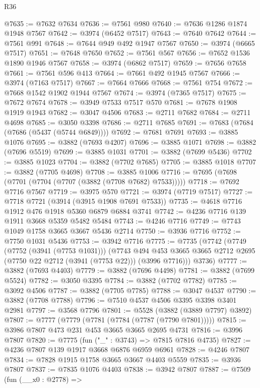 \begin{lexlean}{R36}
\begin{coremodule}
@7635 := @7632 @7634
@7636 := @7561 @980
@7640 := @7636 @1286 @1874 @1948 @7567
@7642 := @3974 (@6452 @7517)
@7643 := @7640 @7642
@7644 := @7561 @991
@7648 := @7644 @949 @492 @1947 @7567
@7650 := @3974 (@6665 @7517)
@7651 := @7648 @7650
@7652 := @7561 @567
@7656 := @7652 @1536 @1890 @1946 @7567
@7658 := @3974 (@6862 @7517)
@7659 := @7656 @7658
@7661 := @7561 @596 @413
@7664 := @7661 @492 @1945 @7567
@7666 := @3974 (@7163 @7517)
@7667 := @7664 @7666
@7668 := @7561 @754
@7672 := @7668 @1542 @1902 @1944 @7567
@7674 := @3974 (@7365 @7517)
@7675 := @7672 @7674
@7678 := @3949 @7533 @7517 @570
@7681 := @7678 @1908 @1919 @1943
@7682 := @3047 @4506
@7683 := @2711 @7682
@7684 := @2711 @4698
@7685 := @3050 @3398
@7686 := @2711 @7685
@7691 := @7683 (@7684 (@7686 (@5437 (@5744 @6849))))
@7692 := @7681 @7691
@7693 := @3885 @1076
@7695 := @3882 (@7693 @4207)
@7696 := @3885 @1071
@7698 := @3882 (@7696 @5519)
@7699 := @3885 @1031
@7701 := @3882 (@7699 @5436)
@7702 := @3885 @1023
@7704 := @3882 (@7702 @7685)
@7705 := @3885 @1018
@7707 := @3882 (@7705 @4698)
@7708 := @3885 @1006
@7716 := @7695 (@7698 (@7701 (@7704 (@7707 (@3882 (@7708 @7682) @7533)))))
@7718 := @7692 @7716 @7567
@7719 := @3975 @570
@7721 := @3974 (@7719 @7517)
@7727 := @7718 @7721 (@3914 (@3915 @1908 @7691 @7533))
@7735 := @4618 @7716 @1912 @476 @1918 @5360 @6879 @6884 @3741
@7742 := @4236 @7716 @139 @1911 @3668 @5359 @5482 @5484
@7743 := @4246 @7716
@7749 := @7743 @1049 @1758 @3665 @3667 @5436 @2714
@7750 := @3936 @7716
@7752 := @7750 @1031 @5436
@7753 := @3942 @7716
@7775 := @7735
    (@7742
      (@7749
        (@7752 (@3941 (@7753 @1031)))
        (@7743
          @494
          @453
          @3665
          @3665
          @2712
          @2695
          (@7750 @22 @2712 (@3941 (@7753 @22)))
          (@3996 @7716)))
      @3736)
@7777 := @3882 (@7693 @4403)
@7779 := @3882 (@7696 @4498)
@7781 := @3882 (@7699 @5524)
@7782 := @3050 @3395
@7784 := @3882 (@7702 @7782)
@7785 := @3092 @4506
@7787 := @3882 (@7705 @7785)
@7788 := @3047 @4537
@7790 := @3882 (@7708 @7788)
@7796 := @7510 @4537 @4506 @3395 @3398 @3401 @2981
@7797 := @3568 @7796
@7801 := @5528 (@3882 (@3889 @7797) @3892)
@7807 := @7777 (@7779 (@7781 (@7784 (@7787 (@7790 @7801)))))
@7815 := @3986 @7807 @473 @231 @453 @3665 @3665 @2695 @4731
@7816 := @3996 @7807
@7820 := @7775 (fun ("_" : @3743) => @7815 @7816 @4735)
@7827 := @4236 @7807 @139 @1917 @3668 @6876 @6959 @6961
@7828 := @4246 @7807
@7834 := @7828 @1915 @1758 @3665 @3667 @4403 @5559
@7835 := @3936 @7807
@7837 := @7835 @1076 @4403
@7838 := @3942 @7807
@7887 := @7509
    (fun (__x0 : @2778) =>

\end{coremodule}
\end{lexlean}
